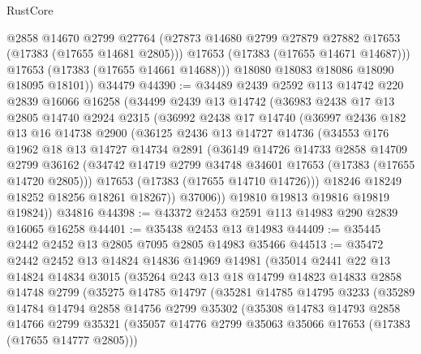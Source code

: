 \begin{lexlean}{RustCore}
\begin{coremodule}
            @2858
            @14670
            @2799
            @27764
            (@27873 @14680 @2799 @27879 @27882 @17653 (@17383 (@17655 @14681 @2805)))
            @17653
            (@17383 (@17655 @14671 @14687)))
          @17653
          (@17383 (@17655 @14661 @14688)))
        @18080
        @18083
        @18086
        @18090
        @18095
        @18101))
    @34479
@44390 := @34489
    @2439
    @2592
    @113
    @14742
    @220
    @2839
    @16066
    @16258
    (@34499
      @2439
      @13
      @14742
      (@36983
        @2438
        @17
        @13
        @2805
        @14740
        @2924
        @2315
        (@36992
          @2438
          @17
          @14740
          (@36997
            @2436
            @182
            @13
            @16
            @14738
            @2900
            (@36125
              @2436
              @13
              @14727
              @14736
              (@34553
                @176
                @1962
                @18
                @13
                @14727
                @14734
                @2891
                (@36149
                  @14726
                  @14733
                  @2858
                  @14709
                  @2799
                  @36162
                  (@34742 @14719 @2799 @34748 @34601 @17653 (@17383 (@17655 @14720 @2805)))
                  @17653
                  (@17383 (@17655 @14710 @14726)))
                @18246
                @18249
                @18252
                @18256
                @18261
                @18267))
            @37006))
        @19810
        @19813
        @19816
        @19819
        @19824))
    @34816
@44398 := @43372 @2453 @2591 @113 @14983 @290 @2839 @16065 @16258
@44401 := @35438 @2453 @13 @14983
@44409 := @35445 @2442 @2452 @13 @2805 @7095 @2805 @14983 @35466
@44513 := @35472
    @2442
    @2452
    @13
    @14824
    @14836
    @14969
    @14981
    (@35014
      @2441
      @22
      @13
      @14824
      @14834
      @3015
      (@35264
        @243
        @13
        @18
        @14799
        @14823
        @14833
        @2858
        @14748
        @2799
        (@35275
          @14785
          @14797
          (@35281
            @14785
            @14795
            @3233
            (@35289
              @14784
              @14794
              @2858
              @14756
              @2799
              @35302
              (@35308
                @14783
                @14793
                @2858
                @14766
                @2799
                @35321
                (@35057 @14776 @2799 @35063 @35066 @17653 (@17383 (@17655 @14777 @2805)))

\end{coremodule}
\end{lexlean}
